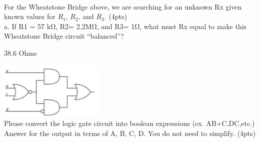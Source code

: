 \documentclass[10pt]{examdesign}
\begin{document}
\begin{shortanswer}[title={Short Answer},rearrange=no,resetcounter=no]
\begin{question}
        \\For the Wheatstone Bridge above, we are searching for an unknown Rx given known values for $R_1$, $R_2$, and $R_3$. (4pts)
        \\a. If R1 = 57 kΩ, R2= 2.2MΩ, and R3= 1Ω, what must Rx equal to make this Wheatstone Bridge circuit “balanced”?
        \begin{answer}
        38.6 Ohms
        \end{answer}
        \end{question}
        \begin{question}
        \includegraphics[width=5cm]{circuit4.png}
        \\Please convert the logic gate circuit into boolean expressions (ex. AB+C,DC,etc.) Answer for the output in terms of A, B, C, D. You do not need to simplify. (4pts)
        

\end{question}
\end{shortanswer}
\end{document}
